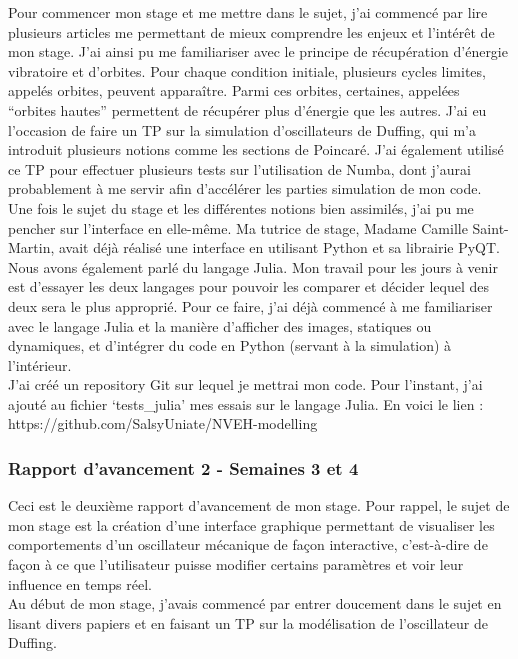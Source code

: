 \documentclass[a4paper, french, 12pt, titlepage]{article}
\begin{document}
Pour commencer mon stage et me mettre dans le sujet, j'ai commencé par lire plusieurs articles me permettant de mieux comprendre les enjeux et l'intérêt de mon stage. J'ai ainsi pu me familiariser avec le principe de récupération d'énergie vibratoire et d'orbites. Pour chaque condition initiale, plusieurs cycles limites, appelés orbites, peuvent apparaître. Parmi ces orbites, certaines, appelées “orbites hautes” permettent de récupérer plus d'énergie que les autres. J'ai eu l'occasion de faire un TP sur la simulation d'oscillateurs de Duffing, qui m'a introduit plusieurs notions comme les sections de Poincaré. J'ai également utilisé ce TP pour effectuer plusieurs tests sur l'utilisation de Numba, dont j'aurai probablement à me servir afin d'accélérer les parties simulation de mon code.\\

Une fois le sujet du stage et les différentes notions bien assimilés, j'ai pu me pencher sur l'interface en elle-même. Ma tutrice de stage, Madame Camille Saint-Martin, avait déjà réalisé une interface en utilisant Python et sa librairie PyQT. Nous avons également parlé du langage Julia. Mon travail pour les jours à venir est d'essayer les deux langages pour pouvoir les comparer et décider lequel des deux sera le plus approprié. Pour ce faire, j'ai déjà commencé à me familiariser avec le langage Julia et la manière d'afficher des images, statiques ou dynamiques, et d'intégrer du code en Python (servant à la simulation) à l'intérieur.  \\

J'ai créé un repository Git sur lequel je mettrai mon code. Pour l'instant, j'ai ajouté au fichier ‘tests\_julia' mes essais sur le langage Julia. En voici le lien : https://github.com/SalsyUniate/NVEH-modelling


\subsubsection*{Rapport d'avancement 2 - Semaines 3 et 4}

Ceci est le deuxième rapport d'avancement de mon stage. Pour rappel, le sujet de mon stage est la création d'une interface graphique permettant de visualiser les comportements d'un oscillateur mécanique de façon interactive, c'est-à-dire de façon à ce que l'utilisateur puisse modifier certains paramètres et voir leur influence en temps réel. \\

Au début de mon stage, j'avais commencé par entrer doucement dans le sujet en lisant divers papiers et en faisant un TP sur la modélisation de l'oscillateur de Duffing. \\
\end{document}
